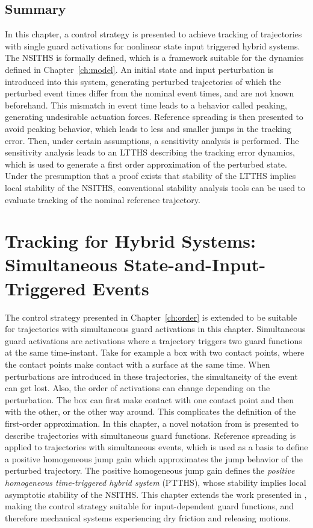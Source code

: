 \documentclass[../DC2017114Bouma.tex]{subfiles}
\begin{document}
\section{Summary}
In this chapter, a control strategy is presented to achieve tracking of trajectories with single guard activations for nonlinear state input triggered hybrid systems. The NSITHS is formally defined, which is a framework suitable for the dynamics defined in Chapter~\ref{ch:model}. An initial state and input perturbation is introduced into this system, generating perturbed trajectories of which the perturbed event times differ from the nominal event times, and are not known beforehand. This mismatch in event time leads to a behavior called peaking, generating undesirable actuation forces. Reference spreading is then presented to avoid peaking behavior, which leads to less and smaller jumps in the tracking error. Then, under certain assumptions, a sensitivity analysis is performed. The sensitivity analysis leads to an LTTHS describing the tracking error dynamics, which is used to generate a first order approximation of the perturbed state. Under the presumption that a proof exists that stability of the LTTHS implies local stability of the NSITHS, conventional stability analysis tools can be used to evaluate tracking of the nominal reference trajectory.
\cleartooddpage
\chapter{Tracking for Hybrid Systems: Simultaneous State-and-Input-Triggered Events}\label{ch:simult}
The control strategy presented in Chapter~\ref{ch:order} is extended to be suitable for trajectories with simultaneous guard activations in this chapter. Simultaneous guard activations are activations where a trajectory triggers two guard functions at the same time-instant. Take for example a box with two contact points, where the contact points make contact with a surface at the same time. When perturbations are introduced in these trajectories, the simultaneity of the event can get lost. Also, the order of activations can change depending on the perturbation. The box can first make contact with one contact point and then with the other, or the other way around. This complicates the definition of the first-order approximation. In this chapter, a novel notation from \cite{Rijnen2018} is presented to describe trajectories with simultaneous guard functions. Reference spreading is applied to trajectories with simultaneous events, which is used as a basis to define a positive homogeneous jump gain which approximates the jump behavior of the perturbed trajectory. The positive homogeneous jump gain defines the \textit{positive homogeneous time-triggered hybrid system} (PTTHS), whose stability implies local asymptotic stability of the NSITHS. This chapter extends the work presented in \cite{Rijnen2018}, making the control strategy suitable for input-dependent guard functions, and therefore mechanical systems experiencing dry friction and releasing motions.
\end{document}
